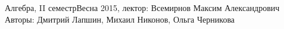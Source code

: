 


\BigHeader
	{Алгебра, II семестр}{Весна 2015, лектор: Всемирнов Максим Александрович}
	{Авторы: Дмитрий Лапшин, Михаил Никонов, Ольга Черникова}
	
 




